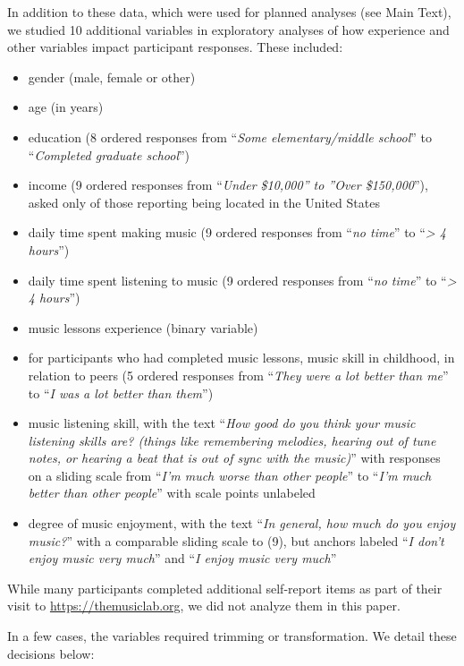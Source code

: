 \documentclass[
]{article}
\providecommand{\tightlist}{%
  \setlength{\itemsep}{0pt}\setlength{\parskip}{0pt}}
\begin{document}
In addition to these data, which were used for planned analyses (see
Main Text), we studied 10 additional variables in exploratory analyses
of how experience and other variables impact participant responses.
These included:

\begin{itemize}
\tightlist
\item
  gender (male, female or other)
\item
  age (in years)
\item
  education (8 ordered responses from ``\emph{Some elementary/middle
  school}'' to ``\emph{Completed graduate school}'')
\item
  income (9 ordered responses from ``\emph{Under \$10,000'' to ''Over
  \$150,000}''), asked only of those reporting being located in the
  United States
\item
  daily time spent making music (9 ordered responses from ``\emph{no
  time}'' to ``\emph{\textgreater{} 4 hours}'')
\item
  daily time spent listening to music (9 ordered responses from
  ``\emph{no time}'' to ``\emph{\textgreater{} 4 hours}'')
\item
  music lessons experience (binary variable)
\item
  for participants who had completed music lessons, music skill in
  childhood, in relation to peers (5 ordered responses from ``\emph{They
  were a lot better than me}'' to ``\emph{I was a lot better than
  them}'')
\item
  music listening skill, with the text ``\emph{How good do you think
  your music listening skills are? (things like remembering melodies,
  hearing out of tune notes, or hearing a beat that is out of sync with
  the music)}'' with responses on a sliding scale from ``\emph{I'm much
  worse than other people}'' to ``\emph{I'm much better than other
  people}'' with scale points unlabeled
\item
  degree of music enjoyment, with the text ``\emph{In general, how much
  do you enjoy music?}'' with a comparable sliding scale to (9), but
  anchors labeled ``\emph{I don't enjoy music very much}'' and ``\emph{I
  enjoy music very much}''
\end{itemize}

While many participants completed additional self-report items as part
of their visit to \url{https://themusiclab.org}, we did not analyze them
in this paper.

In a few cases, the variables required trimming or transformation. We
detail these decisions below:
\end{document}
